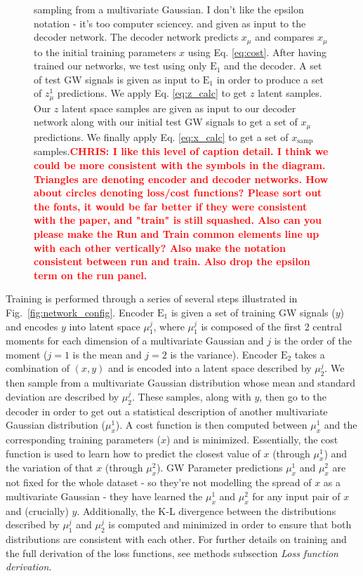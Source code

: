 \documentclass[%
showpacs,
 amsmath,amssymb,
 aps,
 twocolumn,
 prl,
 reprint,
floatfix,
]{revtex4-1}
\newcommand{\chris}[1]{\textbf{\textcolor{red}{CHRIS: #1}}}
\begin{document}
\begin{figure}
{{sampling from a multivariate Gaussian. I don't like the epsilon notation - it's
too computer sciencey.} and given as input to the decoder network. The decoder
network predicts $x_{\mu}$ and compares $x_{\mu}$ to the initial training
parameters $x$ using Eq. \ref{eq:cost}. After having trained our networks, we
test using only $\textrm{E}_1$ and the decoder. A set of test GW signals is
given as input to $\textrm{E}_1$ in order to produce a set of $z^1_{\mu}$
predictions.  We apply Eq. \ref{eq:z_calc} to get $z$ latent samples. Our $z$
latent space samples are given as input to our decoder network along with our
initial test GW signals to get a set of $x_{\mu}$ predictions. We finally apply
Eq.  \ref{eq:x_calc} to get a set of $x_\textrm{samp}$ samples.\chris{I like
this level of caption detail. I think we could be more consistent with the
symbols in the diagram. Triangles are denoting encoder and decoder networks.
How about circles denoting loss/cost functions? Please sort out the fonts, it
would be far better if they were consistent with the paper, and "train" is
still squashed. Also can you please make the Run and Train common elements line
up with each other vertically? Also make the notation consistent between run
and train. Also drop the epsilon term on the run panel.}} 
\end{figure}

%
%
Training is performed through a series of several
steps illustrated in Fig.~\ref{fig:network_config}. Encoder $\textrm{E}_1$ is given a set of training \ac{GW}
signals ($y$) and encodes $y$ into latent space
$\mu^{j}_{1}$, where $\mu^{j}_{1}$ is composed of the first 2 central moments for 
each dimension of a multivariate Gaussian and $j$ is the order of the moment 
($j=1$ is the mean and $j=2$ is the variance). Encoder $\textrm{E}_2$ takes a combination of $(x,y)$ and is
encoded into a latent space described by $\mu^{j}_{2}$.  We then sample
from a multivariate Gaussian distribution whose mean and standard deviation are
described by $\mu^{j}_{2}$. These samples, along with $y$, then go to
the decoder in order to get out a statistical description of another
multivariate Gaussian distribution ($\mu^{1}_x$). A cost function is then
computed between $\mu^{1}_x$ and the corresponding training parameters
($x$) and is minimized.  Essentially, the cost function is used to learn how
to predict the closest value of $x$ (through $\mu^{1}_x$) and the variation of
that $x$ (through $\mu^{2}_x$). \ac{GW} Parameter predictions $\mu^{1}_x$ and $\mu^{2}_x$ are not fixed for the whole
dataset - so they're not modelling the spread of $x$ as a multivariate Gaussian
- they have learned the $\mu^{1}_x$ and $\mu^{2}_x$ for any input pair of $x$
  and (crucially) $y$. Additionally, the K-L divergence between the 
  distributions described by $\mu^{j}_1$ and $\mu^{j}_2$ is computed and minimized in order to ensure that both distributions are
consistent with each other. For further details on training and the full 
derivation of the loss functions, see methods subsection \textit{Loss function derivation}.
\end{document}
